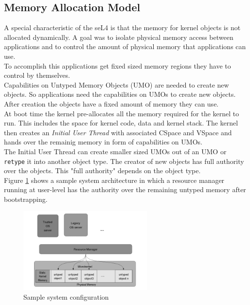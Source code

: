 \subsection{Memory Allocation Model} 
A special characteristic of the seL4 is that the memory for kernel objects is not allocated dynamically. A goal was to isolate physical memory access between applications and to control the amount of physical memory that applications can use. \\
To accomplish this applications get fixed sized memory regions they have to control by themselves. \\
Capabilities on Untyped Memory Objects (UMO) are needed to create new objects. So applications need the capabilities on UMOs to create new objects. After creation the objects have a fixed amount of memory they can use. \\
At boot time the kernel pre-allocates all the memory required for the kernel to run. This includes the space for kernel code, data and kernel stack. The kernel then creates an \textit{Initial User Thread} with associated CSpace and VSpace and hands over the remainig memory in form of capabilities on UMOs. \\
The Initial User Thread can create smaller sized UMOs out of an UMO or \texttt{retype} it into another object type. The creator of new objects has full authority over the objects. This "full authority" depends on the object type. \\
Figure \ref{fig:systarch} shows a sample system architecture in which a resource manager running at user-level  has the authority over the remaining untyped memory after bootstrapping. 
	
	\begin{figure}[ht]
	\centering
		\includegraphics[width=0.6\textwidth]{./Pictures/MemoryAllocation.png}
	\caption[Sample system architecture]{Sample system configuration \cite{TakeG}}
	\label{fig:systarch}
	\end{figure}	